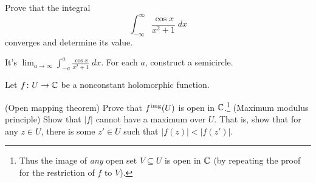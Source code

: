 \begin{problem}
	\twochili
	Prove that the integral
	\[ \int_{-\infty}^{\infty} \frac{\cos x}{x^2+1} \; dx \]
	converges and determine its value.
	\begin{hint}
		It's $\lim_{a \to \infty} \int_{-a}^{a} \frac{\cos x}{x^2+1} \; dx$.
		For each $a$, construct a semicircle.
	\end{hint}
\end{problem}

\begin{sproblem}
	\onechili
	Let $f \colon U \to \mathbb C$ be a nonconstant holomorphic function.
	\begin{enumerate}[(a)]
		\ii (Open mapping theorem)
		Prove that $f^{\text{img}}(U)$ is open in $\mathbb C$.\footnote{Thus
			the image of \emph{any}
			open set $V \subseteq U$ is open in $\mathbb C$
			(by repeating the proof for the restriction of $f$ to $V$).}
		\ii (Maximum modulus principle)
		Show that $\left\lvert f \right\rvert$
		cannot have a maximum over $U$.
		That is, show that for any $z \in U$,
		there is some $z' \in U$ such that
		$\left\lvert f(z) \right\rvert < \left\lvert f(z') \right\rvert$.
	\end{enumerate}
\end{sproblem}
